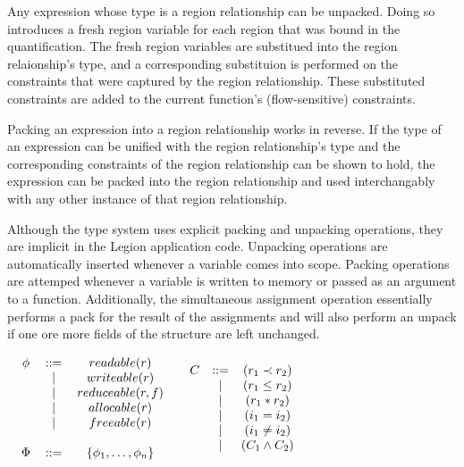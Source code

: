 Any expression whose type is a region relationship can be unpacked.  Doing so
introduces a fresh region variable for each region that was bound in the 
quantification.  The fresh region variables are substitued into the region
relaionship's type, and a corresponding substituion is performed on the
constraints that were captured by the region relationship.  These substituted
constraints are added to the current function's (flow-sensitive) constraints.

Packing an expression into a region relationship works in reverse.  If the type
of an expression can be unified with the region relationship's type and the
corresponding constraints of the region relationship can be shown to hold, the
expression can be packed into the region relationship and used interchangably
with any other instance of that region relationship.

Although the type system uses explicit packing and unpacking operations, they 
are implicit in the Legion application code.  Unpacking operations are 
automatically inserted whenever a variable comes into scope.  Packing operations
are attemped whenever a variable is written to memory or passed as an argument
to a function.  Additionally, the simultaneous assignment operation essentially
performs a pack for the result of the assignments and will also perform an
unpack if one ore more fields of the structure are left unchanged.

\begin{table}
\centering
{\small
\begin{math}
\begin{array}{cc}
\begin{tabular}{ccc}
$\phi$ & ::= & $readable(r)$ \\
  &$\mid$&$writeable(r)$ \\
  &$\mid$&$reduceable(r,f)$ \\
  &$\mid$&$allocable(r)$ \\
  &$\mid$&$freeable(r)$ \\
\\
$\Phi$ & ::= & $\{ \phi_1, \ldots, \phi_n \}$
\end{tabular}
&
\begin{array}{ccc}
C & ::= & (r_1 \prec r_2) \\
  &\mid&(r_1 \le r_2) \\
  &\mid&(r_1 * r_2) \\
  &\mid&(i_1 = i_2) \\
  &\mid&(i_1 \ne i_2) \\
  &\mid&(C_1 \wedge C_2) \\
\end{array}
\end{array}
\end{math}
}
\label{tbl:priv_const}
\caption{Privileges and Constraints}
\end{table}

